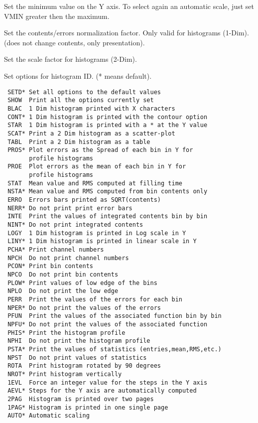 \BEGARG
{}
\ENDARG
\BEGTEXT
Set the minimum value on the Y axis.
To select again an automatic scale, just set VMIN greater then
the maximum.
\ENDTEXT

\BEGARG
{}
\ENDARG
\BEGTEXT
Set the contents/errors normalization factor.
Only valid for histograms (1-Dim).
(does not change contents, only presentation).
\ENDTEXT

\BEGARG
{}
\ENDARG
\BEGTEXT
Set the scale factor for histograms (2-Dim).
\ENDTEXT

\BEGARG
{}
\ENDARG
\BEGTEXT
Set options for histogram ID. (* means default).
\begin{verbatim}
 SETD* Set all options to the default values
 SHOW  Print all the options currently set
 BLAC  1 Dim histogram printed with X characters
 CONT* 1 Dim histogram is printed with the contour option
 STAR  1 Dim histogram is printed with a * at the Y value
 SCAT* Print a 2 Dim histogram as a scatter-plot
 TABL  Print a 2 Dim histogram as a table
 PROS* Plot errors as the Spread of each bin in Y for
       profile histograms
 PROE  Plot errors as the mean of each bin in Y for
       profile histograms
 STAT  Mean value and RMS computed at filling time
 NSTA* Mean value and RMS computed from bin contents only
 ERRO  Errors bars printed as SQRT(contents)
 NERR* Do not print print error bars
 INTE  Print the values of integrated contents bin by bin
 NINT* Do not print integrated contents
 LOGY  1 Dim histogram is printed in Log scale in Y
 LINY* 1 Dim histogram is printed in linear scale in Y
 PCHA* Print channel numbers
 NPCH  Do not print channel numbers
 PCON* Print bin contents
 NPCO  Do not print bin contents
 PLOW* Print values of low edge of the bins
 NPLO  Do not print the low edge
 PERR  Print the values of the errors for each bin
 NPER* Do not print the values of the errors
 PFUN  Print the values of the associated function bin by bin
 NPFU* Do not print the values of the associated function
 PHIS* Print the histogram profile
 NPHI  Do not print the histogram profile
 PSTA* Print the values of statistics (entries,mean,RMS,etc.)
 NPST  Do not print values of statistics
 ROTA  Print histogram rotated by 90 degrees
 NROT* Print histogram vertically
 1EVL  Force an integer value for the steps in the Y axis
 AEVL* Steps for the Y axis are automatically computed
 2PAG  Histogram is printed over two pages
 1PAG* Histogram is printed in one single page
 AUTO* Automatic scaling
\end{verbatim}
\ENDTEXT


